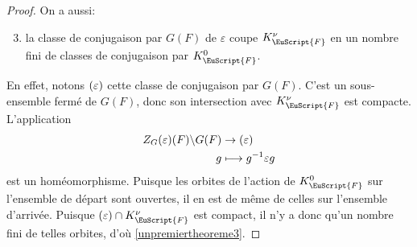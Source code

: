 \documentclass[JEP,XML,SOM,Unicode,francais]{cedram}
\let\mathcal \EuScript
\newcommand{\NoChangel}[1]{%
\expandafter\let\csname old\string#1\endcsname=#1
\let#1=\relax
\newcommand{#1}{\mathcode`l="716C\csname old\string#1\endcsname\mathcode`l="7160 }%
}
\let\epsilon\varepsilon
\newcommand\mto{\mathchoice{\longmapsto}{\mapsto}{\mapsto}{\mapsto}}
\newcommand{\Cl}{\mathrm{Cl}}\NoChangel{\Cl}
\newcommand{\cF}{\mathcal{F}}
\theoremstyle{plain}
\theoremstyle{definition}
\begin{document}
\begin{proof}
On a aussi:
\begin{enumerate}\setcounter{enumi}{2}
\item\label{unpremiertheoreme3}
la classe de conjugaison par $G(F)$ de $\epsilon$ coupe $K_{\cF}^{\nu}$ en un nombre fini de classes de conjugaison par $K_{\cF}^0$.
\end{enumerate}

En effet, notons $\Cl(\epsilon)$ cette classe de conjugaison par $G(F)$. C'est un sous-ensemble fermé de $G(F)$, donc son intersection avec $K_{\cF}^{\nu}$ est compacte. L'application
\begin{align*}
Z_{G}(\epsilon)(F)\backslash G(F)&\to \Cl(\epsilon)\\
g&\mto g^{-1}\epsilon g
\end{align*}
est un homéomorphisme. Puisque les orbites de l'action de $K_{\cF}^{0}$ sur l'ensemble de départ sont ouvertes, il en est de même de celles sur l'ensemble d'arrivée. Puisque $\Cl(\epsilon)\cap K_{\cF}^{\nu}$ est compact, il n'y a donc qu'un nombre fini de telles orbites, d'où \eqref{unpremiertheoreme3}.


\end{proof}
\end{document}
